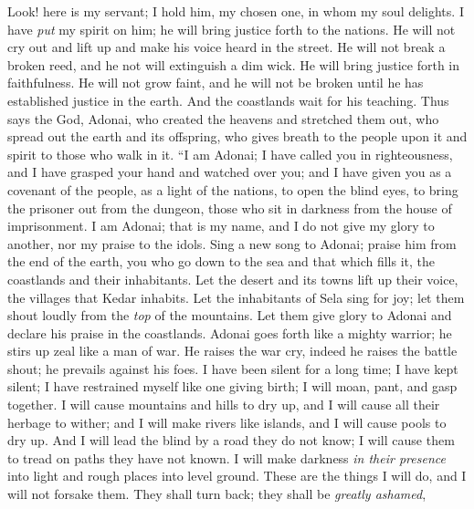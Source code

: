 \begin{biblechapter} %
 Look! here is my servant; I hold him, 
my chosen one, in whom my soul delights. 
I have \textit{put} my spirit on him; 
he will bring justice forth to the nations.
\verse He will not cry out and lift up 
and make his voice heard in the street.
\verse He will not break a broken reed, 
and he not will extinguish a dim wick. 
He will bring justice forth in faithfulness.
\verse He will not grow faint, 
and he will not be broken 
until he has established justice in the earth. 
And the coastlands wait for his teaching.
\verse Thus says the God, Adonai, 
who created the heavens 
and stretched them out, 
who spread out the earth and its offspring, 
who gives breath to the people upon it 
and spirit to those who walk in it.
\verse “I am Adonai; I have called you in righteousness, 
and I have grasped your hand and watched over you; 
and I have given you as a covenant of the people, 
as a light of the nations,
\verse to open the blind eyes, 
to bring the prisoner out from the dungeon, 
those who sit in darkness from the house of imprisonment.
\verse I am Adonai; that is my name,
\verse and I do not give my glory to another, 
nor my praise to the idols.
 Sing a new song to Adonai; 
praise him from the end of the earth, 
you who go down to the sea and that which fills it, 
the coastlands and their inhabitants.
\verse Let the desert and its towns lift up their voice, 
the villages that Kedar inhabits. 
Let the inhabitants of Sela sing for joy; 
let them shout loudly from the \textit{top} of the mountains.
\verse Let them give glory to Adonai 
and declare his praise in the coastlands.
\verse Adonai goes forth like a mighty warrior; 
he stirs up zeal like a man of war. 
He raises the war cry, indeed he raises the battle shout; 
he prevails against his foes.
\verse I have been silent for a long time; 
I have kept silent; 
I have restrained myself like one giving birth; 
I will moan, pant, and gasp together.
\verse I will cause mountains and hills to dry up, 
and I will cause all their herbage to wither; 
and I will make rivers like islands, 
and I will cause pools to dry up.
\verse And I will lead the blind by a road they do not know; 
I will cause them to tread on paths they have not known. 
I will make darkness \textit{in their presence} into light 
and rough places into level ground. 
These are the things I will do, 
and I will not forsake them.
\verse They shall turn back; 
they shall be \textit{greatly ashamed}, 

\end{biblechapter}
